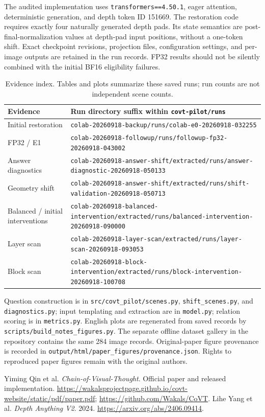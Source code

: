 \documentclass[11pt]{article}
\begin{document}
The audited implementation uses \texttt{transformers==4.50.1}, eager attention, deterministic generation, and depth token ID 151669. The restoration code requires exactly four naturally generated depth pads. Its state semantics are post-final-normalization values at depth-pad input positions, without a one-token shift. Exact checkpoint revisions, projection files, configuration settings, and per-image outputs are retained in the run records. FP32 results should not be silently combined with the initial BF16 eligibility failures.

\begin{table}[htbp]\centering\footnotesize
\begin{tabularx}{\linewidth}{lY}\toprule
Evidence & Run directory suffix within \texttt{covt-pilot/runs}\\\midrule
Initial restoration & \nolinkurl{colab-20260918-backup/runs/colab-e0-20260918-032255}\\
FP32 / E1 & \nolinkurl{colab-20260918-followup/runs/followup-fp32-20260918-043002}\\
Answer diagnostics & \nolinkurl{colab-20260918-answer-shift/extracted/runs/answer-diagnostic-20260918-050133}\\
Geometry shift & \nolinkurl{colab-20260918-answer-shift/extracted/runs/shift-validation-20260918-050713}\\
Balanced / initial interventions & \nolinkurl{colab-20260918-balanced-intervention/extracted/runs/balanced-intervention-20260918-090000}\\
Layer scan & \nolinkurl{colab-20260918-layer-scan/extracted/runs/layer-scan-20260918-093053}\\
Block scan & \nolinkurl{colab-20260918-block-intervention/extracted/runs/block-intervention-20260918-100708}\\\bottomrule
\end{tabularx}\caption{Evidence index. Tables and plots summarize these saved runs; run counts are not independent scene counts.}
\end{table}

Question construction is in \nolinkurl{src/covt_pilot/scenes.py}, \texttt{shift\_scenes.py}, and \texttt{diagnostics.py}; input templating and extraction are in \texttt{model.py}; relation scoring is in \texttt{metrics.py}. English plots are regenerated from saved records by \texttt{scripts/build\_notes\_figures.py}. The separate offline dataset gallery in the repository contains the same 284 image records. Original-paper figure provenance is recorded in \texttt{output/html/paper\_figures/provenance.json}. Rights to reproduced paper figures remain with the original authors.

\begin{thebibliography}{9}
 Yiming Qin et al. \emph{Chain-of-Visual-Thought}. Official paper and released implementation. \url{https://wakalsprojectpage.github.io/covt-website/static/pdf/paper.pdf}; \url{https://github.com/Wakals/CoVT}.
 Lihe Yang et al. \emph{Depth Anything V2}. 2024. \url{https://arxiv.org/abs/2406.09414}.
\end{thebibliography}
\end{document}
